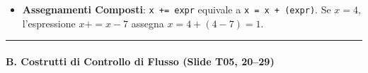 \documentclass[11pt,a4paper]{article}
\newcommand{\passthrough}[1]{#1}
\providecommand{\tightlist}{\setlength{\itemsep}{0pt}\setlength{\parskip}{0pt}}
\begin{document}
\begin{itemize}
  \begin{itemize}
  \tightlist
  \item
    \passthrough{\lstinline!\&!}, \passthrough{\lstinline!|!}: valutano
    sempre entrambi i rami.
  \item
    \passthrough{\lstinline!\&\&!}, \passthrough{\lstinline!||!}:
    valutazione a corto circuito (\emph{short-circuit}). Se il primo
    operando determina già il risultato, il secondo non viene nemmeno
    eseguito (essenziale per prevenire crash su puntatori nulli).
  \end{itemize}
\item
  \textbf{Assegnamenti Composti}: \passthrough{\lstinline!x += expr!}
  equivale a \passthrough{\lstinline!x = x + (expr)!}. Se \(x=4\),
  l'espressione \(x += x - 7\) assegna \(x = 4 + (4 - 7) = 1\).
\end{itemize}

\begin{center}\rule{0.5\linewidth}{0.5pt}\end{center}

\paragraph{B. Costrutti di Controllo di Flusso (Slide T05,
20--29)}\label{b.-costrutti-di-controllo-di-flusso-slide-t05-2029}
\end{document}
